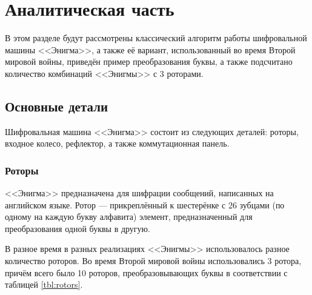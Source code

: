 \chapter{Аналитическая часть}
В этом разделе будут рассмотрены классический алгоритм работы шифровальной машины <<Энигма>>, а также её вариант, использованный во время Второй мировой войны, приведён пример преобразования буквы, а также подсчитано количество комбинаций <<Энигмы>> с 3 роторами.


\section{Основные детали}

Шифровальная машина <<Энигма>> состоит из следующих деталей: роторы, входное колесо, рефлектор, а также коммутационная панель.

\subsection{Роторы}

<<Энигма>> предназначена для шифрации сообщений, написанных на английском языке.
Ротор --- прикреплённый к шестерёнке с 26 зубцами (по одному на каждую букву алфавита) элемент, предназначенный для преобразования одной буквы в другую.

В разное время в разных реализациях <<Энигмы>> использовалось разное количество роторов. Во время Второй мировой войны использовались 3 ротора, причём всего было 10 роторов, преобразовывающих буквы в соответствии с таблицей \ref{tbl:rotors}.

